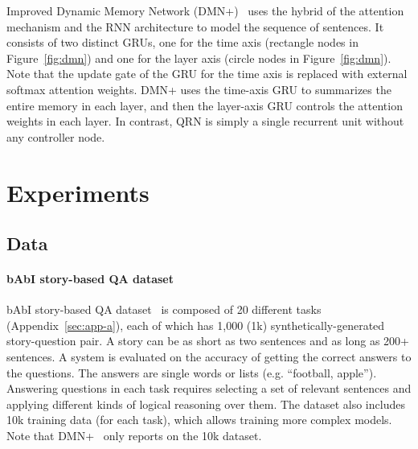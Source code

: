 \documentclass[table]{article}
\begin{document}
Improved Dynamic Memory Network (DMN+)~\citep{DMN+} uses the hybrid of the attention mechanism and the RNN architecture to model the sequence of sentences.
It consists of two distinct GRUs, one for the time axis (rectangle nodes in Figure~\ref{fig:dmn}) and one for the layer axis (circle nodes in Figure~\ref{fig:dmn}).
Note that the update gate of the GRU for the time axis is replaced with external softmax attention weights.
DMN+ uses the time-axis GRU to summarizes the entire memory in each layer, and then the layer-axis GRU controls the attention weights in each layer.
In contrast, QRN is simply a single recurrent unit without any controller node. 




























 
\section{Experiments}\label{sec:qa}


\subsection{Data}
\paragraph{bAbI story-based QA dataset} bAbI story-based QA dataset~\citep{babi} is composed of 20 different tasks (Appendix~\ref{sec:app-a}), each of which has 1,000 (1k) synthetically-generated story-question pair. 
A story can be as short as two sentences and as long as 200+ sentences.
A system is evaluated on the accuracy of  getting the correct answers to the questions. The answers are single words or lists (e.g. ``football, apple'').
Answering questions in each task requires selecting a set of relevant sentences and applying different kinds of logical reasoning over them. 
The dataset also includes 10k training data (for each task), which allows training more complex models. 
Note that DMN+~\citep{DMN+} only reports on the 10k dataset. 
\end{document}
